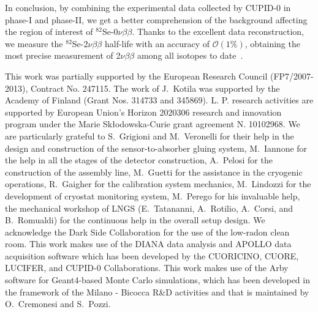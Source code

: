\documentclass[%
reprint,
superscriptaddress,
altaffilletter,
showpacs,
showkeys,
amsmath, amssymb, aps,prl, floatfix,
]{revtex4-1}
\newcommand{\se}{$^{82}$Se\xspace}
\newcommand{\onu}{$0\nu\beta \beta$\xspace}
\newcommand{\vv}{2$\nu\beta\beta$\xspace}
\newcommand{\phone}{phase-I\xspace}
\newcommand{\phtwo}{phase-II\xspace}
\begin{document}
In conclusion, by combining the experimental data collected by CUPID-0 in \phone and \phtwo, we get a better comprehension of the background affecting the region of interest of \se-\onu. Thanks to the excellent data reconstruction, we measure the \se-\vv half-life with an accuracy of $\mathcal{O}(1\%)$, obtaining the most precise measurement of \vv among all isotopes to date~\cite{KamLAND-Zen:2019imh,CUORE:2020bok,CUPID-Mo:2023lru,GERDA:2023wbr}.

\begin{acknowledgments}
This work was partially supported by the European Research Council (FP7/2007-2013), Contract No. 247115. The work of J.~Kotila was supported by the Academy of Finland (Grant Nos. 314733 and 345869).
L. P. research activities are supported by European Union’s Horizon 2020306
research and innovation program under the Marie Skłodowska-Curie grant agreement N. 10102968. We are particularly grateful to S.~Grigioni and M.~Veronelli for their help in the design and construction of the sensor-to-absorber gluing system, M.~Iannone for the help in all the stages of the detector construction, A.~Pelosi for the construction of the assembly line, M.~Guetti for the assistance in the cryogenic operations, R.~Gaigher for the calibration system mechanics, M.~Lindozzi for the development of cryostat monitoring system, M.~Perego for his invaluable help, the mechanical workshop of LNGS (E.~Tatananni, A.~Rotilio, A.~Corsi, and B.~Romualdi) for the continuous help in the overall setup design. We acknowledge the Dark Side Collaboration for the use of the low-radon clean room. This work makes use of the DIANA data analysis and APOLLO data acquisition software which has been developed by the CUORICINO, CUORE, LUCIFER, and CUPID-0 Collaborations. This work makes use of the Arby software for Geant4-based Monte Carlo simulations, which has been developed in the framework of the Milano - Bicocca R\&D activities and that is maintained by O.~Cremonesi and S.~Pozzi.
\end{acknowledgments}

\end{document}
